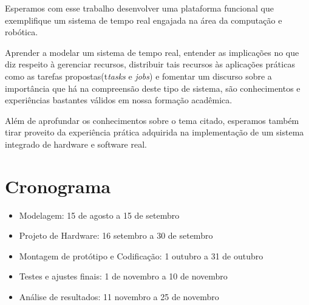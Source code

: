 \documentclass{abnt}
\begin{document}
Esperamos com esse trabalho desenvolver uma plataforma funcional que
exemplifique um sistema de tempo real engajada na área da computação e
robótica. 

Aprender a modelar um sistema de tempo real, entender as implicações no que diz
respeito à gerenciar recursos, distribuir tais recursos às aplicações práticas
como as tarefas propostas(t\textit{tasks} e \textit{jobs}) e fomentar um discurso sobre a
importância que há na compreensão deste tipo de sistema, são conhecimentos e
experiências bastantes válidos em nossa formação acadêmica.

Além de aprofundar os conhecimentos sobre o tema citado, esperamos também tirar
proveito da experiência prática adquirida na implementação de um sistema
integrado de hardware e software real.

\chapter{Cronograma} \label{cronol}  

\begin{itemize}
     
     \item Modelagem: 15 de agosto a 15 de setembro 
     \item Projeto de Hardware: 16 setembro a 30 de setembro 
     \item Montagem de protótipo e Codificação: 1 outubro a 31 de outubro
     \item Testes e ajustes finais: 1 de novembro a 10 de novembro
     \item Análise de resultados: 11 novembro a 25 de novembro

\end{itemize}
\end{document}
